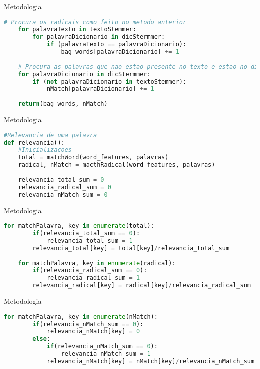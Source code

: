 \documentclass{beamer}
\begin{document}
	\begin{frame}[fragile]{Metodologia}
\begin{lstlisting}[language=Python, caption = Match de radical(cont.)]
	# Procura os radicais como feito no metodo anterior
	for palavraTexto in textoStemmer:
		for palavraDicionario in dicStermmer:
			if (palavraTexto == palavraDicionario):
				bag_words[palavraDicionario] += 1
				
	# Procura as palavras que nao estao presente no texto e estao no dicionario
	for palavraDicionario in dicStermmer:
		if (not palavraDicionario in textoStemmer):
			nMatch[palavraDicionario] += 1
				
	return(bag_words, nMatch)
\end{lstlisting}
	\end{frame}

	\begin{frame}[fragile]{Metodologia}
\begin{lstlisting}[language=Python, caption = Relevância de cada palavra]
#Relevancia de uma palavra	
def relevancia():
	#Inicializacoes
	total = matchWord(word_features, palavras)
	radical, nMatch = macthRadical(word_features, palavras)
	
	relevancia_total_sum = 0
	relevancia_radical_sum = 0
	relevancia_nMatch_sum = 0	
	\end{lstlisting}
\end{frame}

	\begin{frame}[fragile]{Metodologia}
\begin{lstlisting}[language=Python, caption = Relevância de cada palavra(cont.)]
	for matchPalavra, key in enumerate(total):
		if(relevancia_total_sum == 0):
			relevancia_total_sum = 1
		relevancia_total[key] = total[key]/relevancia_total_sum
	
	for matchPalavra, key in enumerate(radical):
		if(relevancia_radical_sum == 0):
			relevancia_radical_sum = 1        
		relevancia_radical[key] = radical[key]/relevancia_radical_sum
\end{lstlisting}
	\end{frame}

	\begin{frame}[fragile]{Metodologia}
\begin{lstlisting}[language=Python, caption = Relevância de cada palavra(cont.)]
	for matchPalavra, key in enumerate(nMatch):
		if(relevancia_nMatch_sum == 0):
			relevancia_nMatch[key] = 0
		else:
			if(relevancia_nMatch_sum == 0):
				relevancia_nMatch_sum = 1
			relevancia_nMatch[key] = nMatch[key]/relevancia_nMatch_sum
\end{lstlisting}
	\end{frame}	
\end{document}
